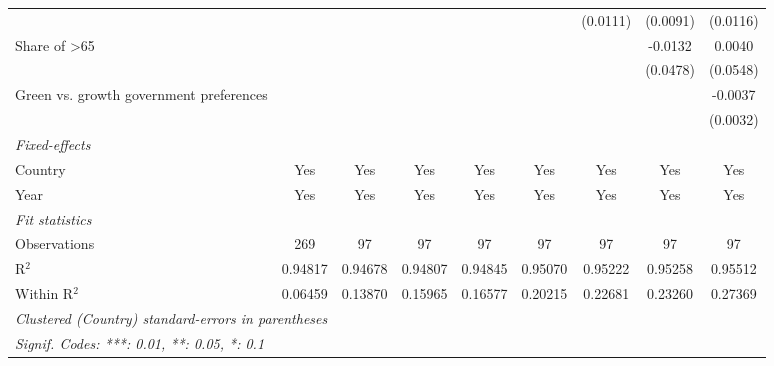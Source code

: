 \begin{table}[htbp]
\begin{tabular}{lcccccccc}
                                              &               &                 &          &          &          & (0.0111) & (0.0091) & (0.0116)\\   
      Share of >65                            &               &                 &          &          &          &          & -0.0132  & 0.0040\\   
                                              &               &                 &          &          &          &          & (0.0478) & (0.0548)\\   
      Green vs. growth government preferences &               &                 &          &          &          &          &          & -0.0037\\   
                                              &               &                 &          &          &          &          &          & (0.0032)\\   
      \midrule
      \emph{Fixed-effects}\\
      Country                                 & Yes           & Yes             & Yes      & Yes      & Yes      & Yes      & Yes      & Yes\\  
      Year                                    & Yes           & Yes             & Yes      & Yes      & Yes      & Yes      & Yes      & Yes\\  
      \midrule
      \emph{Fit statistics}\\
      Observations                            & 269           & 97              & 97       & 97       & 97       & 97       & 97       & 97\\  
      R$^2$                                   & 0.94817       & 0.94678         & 0.94807  & 0.94845  & 0.95070  & 0.95222  & 0.95258  & 0.95512\\  
      Within R$^2$                            & 0.06459       & 0.13870         & 0.15965  & 0.16577  & 0.20215  & 0.22681  & 0.23260  & 0.27369\\  
      \midrule \midrule
      \multicolumn{9}{l}{\emph{Clustered (Country) standard-errors in parentheses}}\\
      \multicolumn{9}{l}{\emph{Signif. Codes: ***: 0.01, **: 0.05, *: 0.1}}\\
   \end{tabular}
\end{table}


